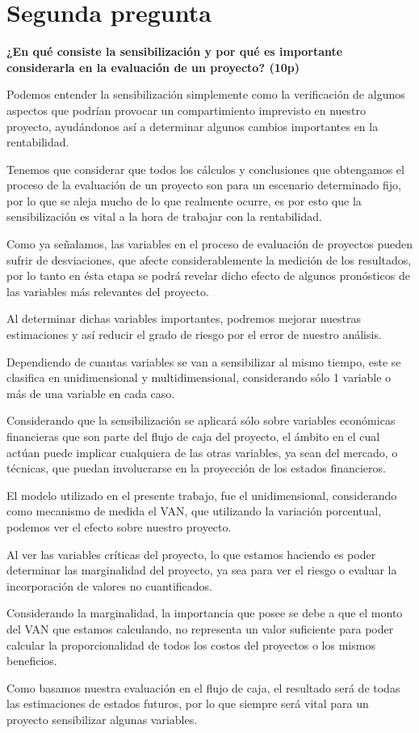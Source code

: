 \section{Segunda pregunta}

{\bf ¿En qué consiste la sensibilización y por qué es importante considerarla en la evaluación de un proyecto? (10p)}


Podemos entender la sensibilización simplemente como la verificación de algunos aspectos que podrían provocar
un compartimiento imprevisto en nuestro proyecto, ayudándonos así a determinar algunos cambios importantes en la rentabilidad.

Tenemos que considerar que todos los cálculos y conclusiones que obtengamos el proceso de la evaluación de un proyecto
son para un escenario determinado fijo, por lo que se aleja mucho de lo que realmente ocurre,
es por esto que la sensibilización es vital a la hora de trabajar con la rentabilidad.

Como ya señalamos, las variables en el proceso de evaluación de proyectos pueden sufrir de desviaciones,
que afecte considerablemente la medición de los resultados, por lo tanto en ésta etapa se podrá
revelar dicho efecto de algunos pronósticos de las variables más relevantes del proyecto.

Al determinar dichas variables importantes, podremos mejorar
nuestras estimaciones y así reducir el grado de riesgo por el error
de nuestro análisis.

Dependiendo de cuantas variables se van a sensibilizar al mismo tiempo,
este se clasifica en unidimensional y multidimensional,
considerando sólo 1 variable o más de una variable en cada caso.

Considerando que la sensibilización se aplicará sólo sobre variables económicas financieras
que son parte del flujo de caja del proyecto, el ámbito en el cual actúan puede
implicar cualquiera de las otras variables, ya sean del mercado, o técnicas,
que puedan involucrarse en la proyección de los estados financieros.

El modelo utilizado en el presente trabajo, fue el unidimensional,
considerando como mecanismo de medida el VAN, que utilizando la variación
porcentual, podemos ver el efecto sobre nuestro proyecto.

Al ver las variables críticas del proyecto, lo que estamos haciendo
es poder determinar las marginalidad del proyecto,
ya sea para ver el riesgo o evaluar la incorporación de valores
no cuantificados.

Considerando la marginalidad, la importancia que posee se debe a que el monto del VAN que estamos
calculando, no representa un valor suficiente para poder calcular la proporcionalidad de todos los costos
del proyectos o los mismos beneficios.

Como basamos nuestra evaluación en el flujo de caja, el resultado
será de todas las estimaciones de estados futuros,
por lo que siempre será vital para un proyecto sensibilizar algunas variables.
